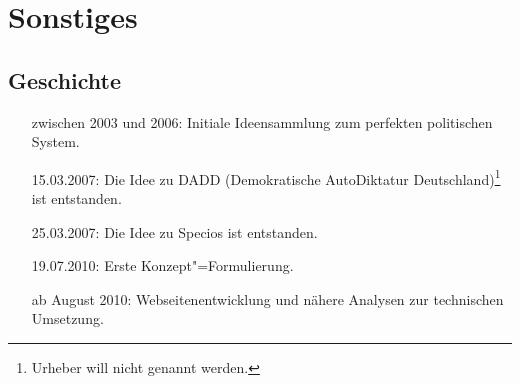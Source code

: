 \chapter{Sonstiges}\label{chap:misc}

\section{Geschichte}\label{sec:history}

\begin{itemize}[zwischen 2003 und 2006:]
\item[zwischen 2003 und 2006:] Initiale Ideensammlung zum perfekten politischen System.
\item[15.03.2007:] Die Idee zu DADD (Demokratische AutoDiktatur Deutschland)\footnote{Urheber will nicht genannt werden.} ist entstanden.
\item[25.03.2007:] Die Idee zu Specios ist entstanden.
\item[19.07.2010:] Erste Konzept"=Formulierung.
\item[ab August 2010:] Webseitenentwicklung und nähere Analysen zur technischen Umsetzung.
\end{itemize}